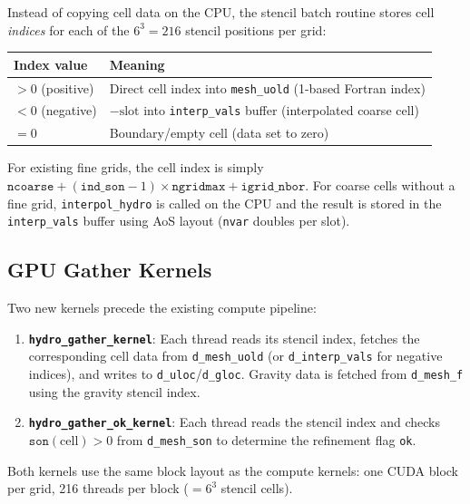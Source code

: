 \documentclass[11pt,fleqn]{book}
\begin{document}
Instead of copying cell data on the CPU, the stencil batch routine stores cell \emph{indices} for each of the $6^3 = 216$ stencil positions per grid:

\begin{center}
\begin{tabular}{ll}
\toprule
\textbf{Index value} & \textbf{Meaning} \\
\midrule
$> 0$ (positive) & Direct cell index into \texttt{mesh\_uold} (1-based Fortran index) \\
$< 0$ (negative) & $-\text{slot}$ into \texttt{interp\_vals} buffer (interpolated coarse cell) \\
$= 0$            & Boundary/empty cell (data set to zero) \\
\bottomrule
\end{tabular}
\end{center}

For existing fine grids, the cell index is simply $\texttt{ncoarse} + (\texttt{ind\_son}-1) \times \texttt{ngridmax} + \texttt{igrid\_nbor}$.  For coarse cells without a fine grid, \texttt{interpol\_hydro} is called on the CPU and the result is stored in the \texttt{interp\_vals} buffer using AoS layout (\texttt{nvar} doubles per slot).

\subsection{GPU Gather Kernels}

Two new kernels precede the existing compute pipeline:

\begin{enumerate}[nosep]
\item \textbf{\texttt{hydro\_gather\_kernel}}: Each thread reads its stencil index, fetches the corresponding cell data from \texttt{d\_mesh\_uold} (or \texttt{d\_interp\_vals} for negative indices), and writes to \texttt{d\_uloc}/\texttt{d\_gloc}.  Gravity data is fetched from \texttt{d\_mesh\_f} using the gravity stencil index.

\item \textbf{\texttt{hydro\_gather\_ok\_kernel}}: Each thread reads the stencil index and checks $\texttt{son}(\text{cell}) > 0$ from \texttt{d\_mesh\_son} to determine the refinement flag \texttt{ok}.
\end{enumerate}

Both kernels use the same block layout as the compute kernels: one CUDA block per grid, 216 threads per block ($= 6^3$ stencil cells).
\end{document}
